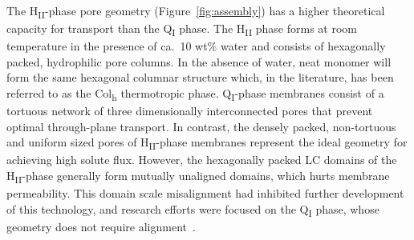 \documentclass[journal=jpcbfk,manuscript=article]{achemso}
\begin{document}
  The H\textsubscript{II}-phase pore geometry (Figure~\ref{fig:assembly}) has a
  higher theoretical capacity for transport than the Q\textsubscript{I} phase.
  The H\textsubscript{II} phase forms at room temperature in the presence of
  ca.~10 wt\% water and consists of hexagonally packed, hydrophilic pore
  columns\cite{smith_ordered_1997}. In the absence of water, neat monomer will
  form the same hexagonal columnar structure which, in the literature, has been
  referred to as the Col\textsubscript{h} thermotropic
  phase\cite{feng_scalable_2014}. 
  Q\textsubscript{I}-phase membranes consist of a tortuous network of three
  dimensionally interconnected pores that prevent optimal through-plane
  transport. In contrast, the densely packed, non-tortuous and uniform sized
  pores of H\textsubscript{II}-phase membranes represent the ideal geometry for
  achieving high solute flux\cite{matyka_tortuosity-porosity_2008}.  However, the
  hexagonally packed LC domains of the H\textsubscript{II}-phase
  generally form mutually unaligned domains, which 
  hurts
  membrane permeability. This domain scale misalignment
  had inhibited further development of this technology, and research efforts
  were focused on the Q\textsubscript{I} phase, whose geometry does not require
  alignment~\cite{zhou_new_2007}. 

\end{document}
